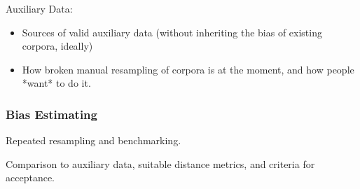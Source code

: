 Auxiliary Data:
\begin{itemize}
    \item Sources of valid auxiliary data (without inheriting the bias of existing corpora, ideally)
    \item How broken manual resampling of corpora is at the moment, and how people *want* to do it.
\end{itemize}
\subsubsection{Bias Estimating}
Repeated resampling and benchmarking.

Comparison to auxiliary data, suitable distance metrics, and criteria for acceptance.




